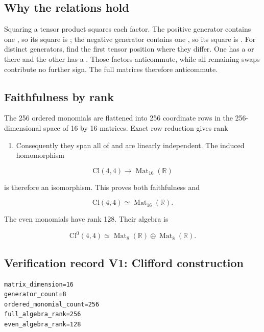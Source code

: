 \documentclass[11pt]{article}
\begin{document}
\subsection{Why the relations hold}

Squaring a tensor product squares each factor. The positive generator contains one \texttt{}, so its square is \texttt{}; the negative generator contains one \texttt{}, so its square is \texttt{}. For distinct generators, find the first tensor position where they differ. One has a \texttt{} or \texttt{} there and the other has a \texttt{}. Those factors anticommute, while all remaining swaps contribute no further sign. The full matrices therefore anticommute.

\subsection{Faithfulness by rank}

The 256 ordered monomials are flattened into 256 coordinate rows in the 256-dimensional space of 16 by 16 matrices. Exact row reduction gives rank

\begin{enumerate}
\item Consequently they span all of \texttt{} and are linearly independent.
The induced homomorphism

\end{enumerate}

\[
\mathrm{Cl}(4,4)\longrightarrow\operatorname{Mat}_{16}(\mathbb R)
\]

is therefore an isomorphism. This proves both faithfulness and

\[
\mathrm{Cl}(4,4)\simeq\operatorname{Mat}_{16}(\mathbb R).
\]

The even monomials have rank 128. Their algebra is

\[
\mathrm{Cl}^0(4,4)\simeq
\operatorname{Mat}_{8}(\mathbb R)\mathbin{\oplus}
\operatorname{Mat}_{8}(\mathbb R).
\]

\subsection{Verification record V1: Clifford construction}

\begin{Verbatim}[fontsize=\small]
matrix_dimension=16
generator_count=8
ordered_monomial_count=256
full_algebra_rank=256
even_algebra_rank=128
\end{Verbatim}
\end{document}

